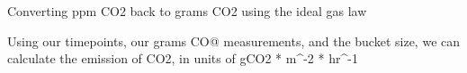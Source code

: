 \documentclass[]{article}
\newenvironment{Shaded}{\begin{snugshade}}{\end{snugshade}}
\newcommand{\KeywordTok}[1]{\textcolor[rgb]{0.13,0.29,0.53}{\textbf{#1}}}
\newcommand{\DataTypeTok}[1]{\textcolor[rgb]{0.13,0.29,0.53}{#1}}
\newcommand{\DecValTok}[1]{\textcolor[rgb]{0.00,0.00,0.81}{#1}}
\newcommand{\FloatTok}[1]{\textcolor[rgb]{0.00,0.00,0.81}{#1}}
\newcommand{\StringTok}[1]{\textcolor[rgb]{0.31,0.60,0.02}{#1}}
\newcommand{\CommentTok}[1]{\textcolor[rgb]{0.56,0.35,0.01}{\textit{#1}}}
\newcommand{\OperatorTok}[1]{\textcolor[rgb]{0.81,0.36,0.00}{\textbf{#1}}}
\newcommand{\NormalTok}[1]{#1}
\begin{document}
Converting ppm CO2 back to grams CO2 using the ideal gas law

\begin{Shaded}
\end{Shaded}

Using our timepoints, our grams CO@ measurements, and the bucket size,
we can calculate the emission of CO2, in units of gCO2 * m\^{}-2 *
hr\^{}-1
\end{document}
